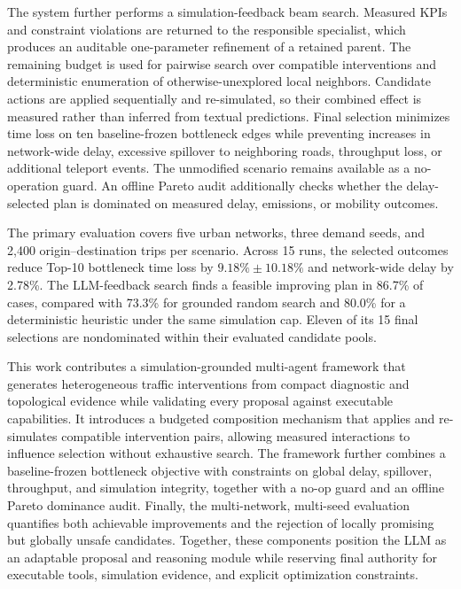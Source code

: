 The system further performs a simulation-feedback beam search.  Measured KPIs
and constraint violations are returned to the responsible specialist, which
produces an auditable one-parameter refinement of a retained parent.  The
remaining budget is used for pairwise search over compatible interventions and
deterministic enumeration of otherwise-unexplored local neighbors.
Candidate actions are applied sequentially and re-simulated, so their combined
effect is measured rather than inferred from textual predictions.  Final selection minimizes time loss on ten baseline-frozen
bottleneck edges while preventing increases in network-wide delay, excessive
spillover to neighboring roads, throughput loss, or additional teleport events.
The unmodified scenario remains available as a no-operation guard.  An offline
Pareto audit additionally checks whether the delay-selected plan is dominated
on measured delay, emissions, or mobility outcomes.

The primary evaluation covers five urban networks, three demand seeds, and
2,400 origin--destination trips per scenario.  Across 15 runs, the selected
outcomes reduce Top-10 bottleneck time loss by $9.18\%\pm10.18\%$ and
network-wide delay by 2.78\%.  The LLM-feedback search finds a feasible
improving plan in 86.7\% of cases, compared with 73.3\% for grounded random
search and 80.0\% for a deterministic heuristic under the same simulation cap.
Eleven of its 15 final selections are nondominated within their evaluated
candidate pools.

This work contributes a simulation-grounded multi-agent framework that generates
heterogeneous traffic interventions from compact diagnostic and topological
evidence while validating every proposal against executable capabilities.  It
introduces a budgeted composition mechanism that applies and re-simulates
compatible intervention pairs, allowing measured interactions to influence
selection without exhaustive search.  The framework further combines a
baseline-frozen bottleneck objective with constraints on global delay,
spillover, throughput, and simulation integrity, together with a no-op guard
and an offline Pareto dominance audit.  Finally, the multi-network, multi-seed
evaluation quantifies both achievable improvements and the rejection of locally
promising but globally unsafe candidates.  Together, these components position
the LLM as an adaptable proposal and reasoning module while reserving final
authority for executable tools, simulation evidence, and explicit optimization
constraints.
